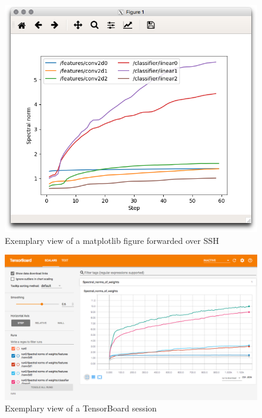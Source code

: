 \begin{figure}
    \hypertarget{fig:example_mpl}{%
        \centering
        \includegraphics[max width=\textwidth]{gfx/diagrams/software_screens/example_mpl.png}
        \caption{Exemplary view of a matplotlib figure forwarded over SSH}\label{fig:example_mpl}
    }
\end{figure}

\begin{figure}
    \hypertarget{fig:example_tb}{%
        \centering
        \includegraphics[width=\textwidth]{gfx/diagrams/software_screens/example_tb.png}
        \caption{Exemplary view of a TensorBoard session}\label{fig:example_tb}
    }
\end{figure}

